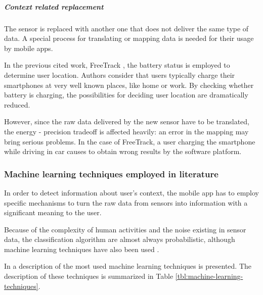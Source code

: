 \subparagraph{Context related replacement}
\label{subp:context_related_replacement}

The sensor is replaced with another one that does not deliver the same type of data.
A special process for translating or mapping data is needed for their usage by mobile apps.

In the previous cited work, FreeTrack \cite{Chon2014}, the battery status is employed to determine user location.
Authors consider that users typically charge their smartphones at very well known places, like home or work.
By checking whether battery is charging, the possibilities for deciding user location are dramatically reduced.

However, since the raw data delivered by the new sensor have to be translated, the energy - precision tradeoff is affected heavily: an error in the mapping may bring serious problems.
In the case of FreeTrack, a user charging the smartphone while driving in car causes to obtain wrong results by the software platform.

\subsubsection{Machine learning techniques employed in literature}

In order to detect information about user's context, the mobile app has to employ specific mechanisms to turn the raw data from sensors into information with a significant meaning to the user.

Because of the complexity of human activities and the noise existing in sensor data, the classification algorithm are almost always probabilistic, although machine learning techniques have also been used \cite{Choudhury2008}.

In \cite{Donohoo2014} a description of the most used machine learning techniques is presented. The description of these techniques is summarized in Table \ref{tbl:machine-learning-techniques}.

